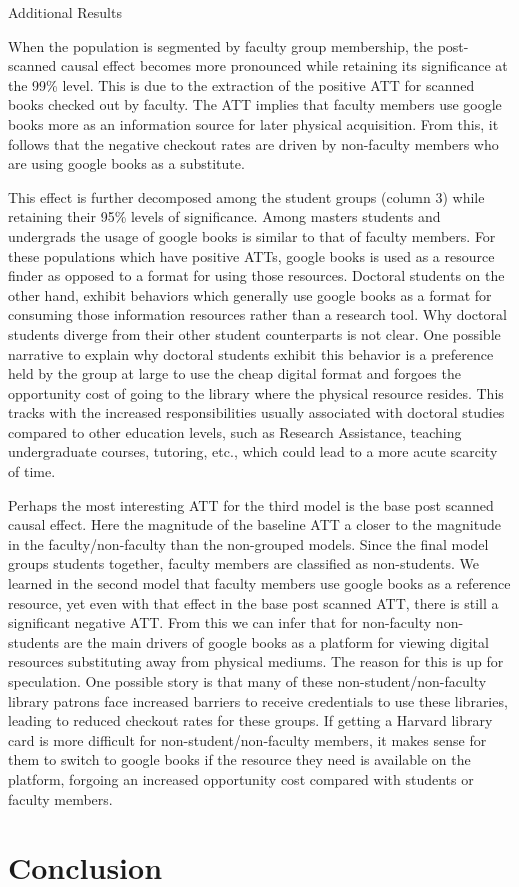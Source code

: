 \documentclass{article}
\begin{document}
\begin{table}[htbp]
   \centering
   \caption{Additional Results}
  
   \label{tab:booktabs}
\end{table}

When the population is segmented by faculty group membership, the post-scanned causal effect becomes more pronounced while retaining its significance at the 99\% level. This is due to the extraction of the positive ATT for scanned books checked out by faculty. The ATT implies that faculty members use google books more as an information source for later physical acquisition. From this, it follows that the negative checkout rates are driven by non-faculty members who are using google books as a substitute. 

This effect is further decomposed among the student groups (column 3) while retaining their 95\% levels of significance. Among masters students and undergrads the usage of google books is similar to that of faculty members. For these populations which have positive ATTs, google books is used as a resource finder as opposed to a format for using those resources. Doctoral students on the other hand, exhibit behaviors which generally use google books as a format for consuming those information resources rather than a research tool. Why doctoral students diverge from their other student counterparts is not clear. One possible narrative to explain why doctoral students exhibit this behavior is a preference held by the group at large to use the cheap digital format and forgoes the opportunity cost of going to the library where the physical resource resides. This tracks with the increased responsibilities usually associated with doctoral studies compared to other education levels, such as Research Assistance, teaching undergraduate courses, tutoring, etc., which could lead to a more acute scarcity of time.

Perhaps the most interesting ATT for the third model is the base post scanned causal effect. Here the magnitude of the baseline ATT a closer to the magnitude in the faculty/non-faculty than the non-grouped models. Since the final model groups students together, faculty members are classified as non-students. We learned in the second model that faculty members use google books as a reference resource, yet even with that effect in the base post scanned ATT, there is still a significant negative ATT. From this we can infer that for non-faculty non-students are the main drivers of google books as a platform for viewing digital resources substituting away from physical mediums. The reason for this is up for speculation. One possible story is that many of these non-student/non-faculty library patrons face increased barriers to receive credentials to use these libraries, leading to reduced checkout rates for these groups. If getting a Harvard library card is more difficult for non-student/non-faculty members, it makes sense for them to switch to google books if the resource they need is available on the platform, forgoing an increased opportunity cost compared with students or faculty members.





\section{Conclusion}
\end{document}
